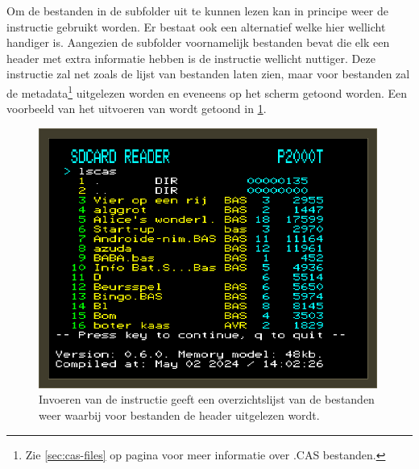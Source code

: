 Om de bestanden in de subfolder  uit te kunnen lezen kan in principe weer de instructie  gebruikt worden. Er bestaat ook een alternatief welke hier wellicht handiger is. Aangezien de subfolder  voornamelijk  bestanden bevat die elk een header met extra informatie hebben is de instructie  wellicht nuttiger. Deze instructie zal net zoals  de lijst van bestanden laten zien, maar voor  bestanden zal de metadata\footnote{Zie \cref{sec:cas-files} op pagina \pageref{sec:cas-files} voor meer informatie over .CAS bestanden.} uitgelezen worden en eveneens op het scherm getoond worden. Een voorbeeld van het uitvoeren van  wordt getoond in \cref{fig:screenshot-lscas}.

\begin{figure}[h!]
    \centering
    \includegraphics[width=0.99\textwidth]{img/lscas.png}
    \caption{Invoeren van de instructie  geeft een overzichtslijst van de bestanden weer waarbij voor  bestanden de header uitgelezen wordt.}
    \label{fig:screenshot-lscas}
\end{figure}

